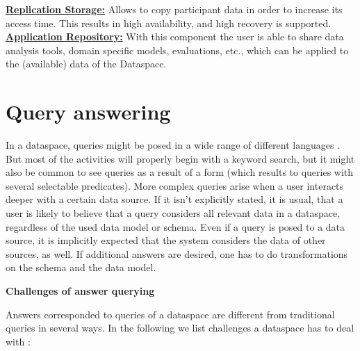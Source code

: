 \uline{\textbf{Replication Storage:}} Allows to copy participant data in order to increase its access time. This results in high availability, and high recovery is supported.\\

\uline{\textbf{Application Repository:}} With this component the user is able to share data analysis tools, domain specific models, evaluations, etc., which can be applied to the (available) data of the Dataspace.\\


\section{Query answering}

In a dataspace, queries might be posed in a wide range of different languages \cite[p. 3]{Halevy:2006:PDS:1142351.1142352}. But most of the activities will properly begin with a keyword search, but it might also be common to see queries as a result of a form (which results to queries with several selectable predicates). More complex queries arise when a user interacts deeper with a certain data source. If it isn't explicitly stated, it is usual, that a user is likely to believe that a query considers all relevant data in a dataspace, regardless of the used data model or schema. Even if a query is posed to a data source, it is implicitly expected that the system considers the data of other sources, as well. If additional answers are desired, one has to do transformations on the schema and the data model.

\textbf{Challenges of answer querying}

Answers corresponded to queries of a dataspace are different from traditional queries in several ways. In the following we list challenges a dataspace has to deal with \cite[p. 3-4]{Halevy:2006:PDS:1142351.1142352}:

